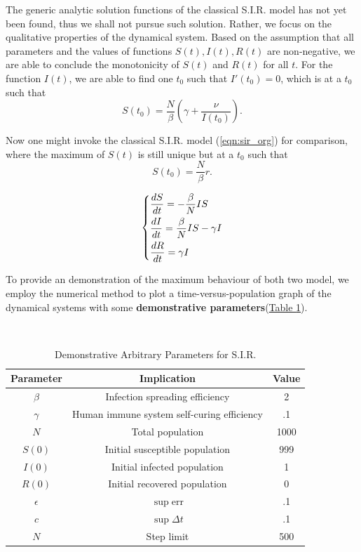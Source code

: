 \documentclass{article}
\newcommand{\MRef}[2]{\hyperref[#2]{#1 \ref*{#2}}}
\begin{document}
The generic analytic solution functions of the classical S.I.R. model has not yet been found, thus we shall not pursue such solution.  Rather, we focus on the qualitative properties of the dynamical system. Based on the assumption that all parameters and the values of functions $S(t),I(t),R(t)$ are non-negative, we are able to conclude the monotonicity of $S(t)$ and $R(t)$ for all $t$. For the function $I(t)$, we are able to find one $t_0$ such that $I'(t_0)=0$, which is at a $t_0$ such that \[S(t_0)=\frac{N}{\beta}\left(\gamma+\frac{\nu}{I(t_0)}\right).\]

Now one might invoke the classical S.I.R. model (\ref{eqn:sir_org}) for comparison, where the maximum of $S(t)$ is still unique but at a $t_0$ such that \[S(t_0)=\frac{N}{\beta}r.\]

\begin{gather}
\label{eqn:sir_org}
\begin{dcases}
\frac{dS}{dt}=-\frac{\beta}{N}IS\\
\frac{dI}{dt}=\frac{\beta}{N}IS-\gamma I\\
\frac{dR}{dt}=\gamma I
\end{dcases}
\end{gather}

To provide an demonstration of the maximum behaviour of both two model, we employ the numerical method to plot a time-versus-population graph of the dynamical systems with some \textbf{demonstrative parameters}(\MRef{Table}{tab:demo_parameters_ori_sir}).

\begin{table}[htbp]
        \centering
        \caption{Demonstrative Arbitrary Parameters for S.I.R.}\\[4pt]
        \label{tab:demo_parameters_ori_sir}
        \begin{tabular}{c|c|c}
            Parameter & Implication & Value \\\hline
            $\beta$ & Infection spreading efficiency & 2 \\
            $\gamma$ & Human immune system self-curing efficiency & .1 \\
            $N$ & Total population & 1000 \\\hline
            $S(0)$ & Initial susceptible population & 999 \\
            $I(0)$ & Initial infected population & 1 \\
            $R(0)$ & Initial recovered population & 0 \\\hline
            $\epsilon$ & $\sup\mathrm{err}$ & .1 \\
            $c$ & $\sup\Delta t$ & .1 \\
            $N$ & Step limit & 500 \\
        \end{tabular}
        \end{table}
\end{document}
